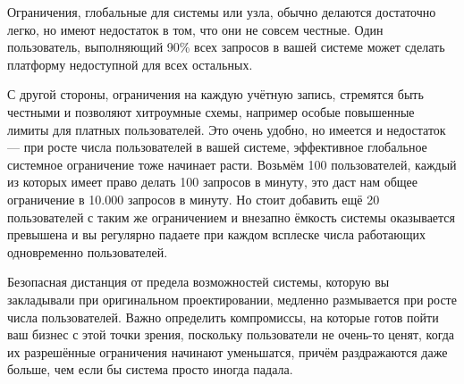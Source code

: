 Ограничения, глобальные для системы или узла, обычно делаются достаточно легко, но имеют недостаток в том, что они не совсем честные. Один пользователь, выполняющий 90\% всех запросов в вашей системе может сделать платформу недоступной для всех остальных.

С другой стороны, ограничения на каждую учётную запись, стремятся быть честными и позволяют хитроумные схемы, например особые повышенные лимиты для платных пользователей. Это очень удобно, но имеется и недостаток --- при росте числа пользователей в вашей системе, эффективное глобальное системное ограничение тоже начинает расти. Возьмём 100 пользователей, каждый из которых имеет право делать 100 запросов в минуту, это даст нам общее ограничение в 10.000 запросов в минуту. Но стоит добавить ещё 20 пользователей с таким же ограничением и внезапно ёмкость системы оказывается превышена и вы регулярно падаете при каждом всплеске числа работающих одновременно пользователей.

Безопасная дистанция от предела возможностей системы, которую вы закладывали при оригинальном проектировании, медленно размывается при росте числа пользователей. Важно определить компромиссы, на которые готов пойти ваш бизнес с этой точки зрения, поскольку пользователи не очень-то ценят, когда их разрешённые ограничения начинают уменьшатся, причём раздражаются даже больше, чем если бы система просто иногда падала.


